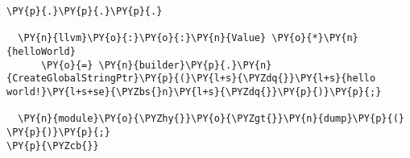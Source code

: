 \begin{Verbatim}[commandchars=\\\{\}]
          \PY{p}{.}\PY{p}{.}\PY{p}{.}

  \PY{n}{llvm}\PY{o}{:}\PY{o}{:}\PY{n}{Value} \PY{o}{*}\PY{n}{helloWorld}
      \PY{o}{=} \PY{n}{builder}\PY{p}{.}\PY{n}{CreateGlobalStringPtr}\PY{p}{(}\PY{l+s}{\PYZdq{}}\PY{l+s}{hello world!}\PY{l+s+se}{\PYZbs{}n}\PY{l+s}{\PYZdq{}}\PY{p}{)}\PY{p}{;}

  \PY{n}{module}\PY{o}{\PYZhy{}}\PY{o}{\PYZgt{}}\PY{n}{dump}\PY{p}{(} \PY{p}{)}\PY{p}{;}
\PY{p}{\PYZcb{}}
\end{Verbatim}
